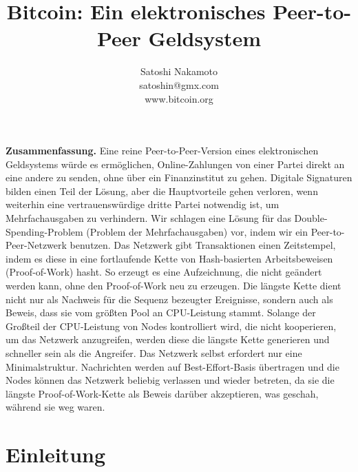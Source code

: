 \documentclass[9pt]{article}
\title{\huge{\textbf{Bitcoin: Ein elektronisches Peer-to-Peer Geldsystem}}}
\author{\normalsize Satoshi Nakamoto\\ \normalsize satoshin@gmx.com\\ \normalsize www.bitcoin.org}
\date{}
\makeatletter
\renewenvironment{abstract}{%
  \if@twocolumn
    \section*{\abstractname}
  \else
    \small
    \vspace*{-9mm}
    \begin{center}
    \end{center} 
    \quotation
  \fi
}
{
  \if@twocolumn
  \else
    \endquotation
  \fi
}
\makeatother
\begin{document}
	\maketitle
	
	\begin{abstract}
		\noindent \textbf{Zusammenfassung.} \quad Eine reine Peer-to-Peer-Version eines elektronischen Geldsystems würde es ermöglichen, Online-Zahlungen von einer Partei direkt an eine andere zu senden, ohne über ein Finanzinstitut zu gehen. Digitale Signaturen bilden einen Teil der Lösung, aber die Hauptvorteile gehen verloren, wenn weiterhin eine vertrauenswürdige dritte Partei notwendig ist, um Mehrfachausgaben zu verhindern. Wir schlagen eine Lösung für das Double-Spending-Problem (Problem der Mehrfachausgaben) vor, indem wir ein Peer-to-Peer-Netzwerk benutzen. Das Netzwerk gibt Transaktionen einen Zeitstempel, indem es diese in eine fortlaufende Kette von Hash-basierten Arbeitsbeweisen (Proof-of-Work) hasht. So erzeugt es eine Aufzeichnung, die nicht geändert werden kann, ohne den Proof-of-Work neu zu erzeugen. Die längste Kette dient nicht nur als Nachweis für die Sequenz bezeugter Ereignisse, sondern auch als Beweis, dass sie vom größten Pool an CPU-Leistung stammt. Solange der Großteil der CPU-Leistung von Nodes kontrolliert wird, die nicht kooperieren, um das Netzwerk anzugreifen, werden diese die längste Kette generieren und schneller sein als die Angreifer. Das Netzwerk selbst erfordert nur eine Minimalstruktur. Nachrichten werden auf Best-Effort-Basis übertragen und die Nodes können das Netzwerk beliebig verlassen und wieder betreten, da sie die längste Proof-of-Work-Kette als Beweis darüber akzeptieren, was geschah, während sie weg waren.
	\end{abstract}
	
	\section{Einleitung}
	
\end{document}
